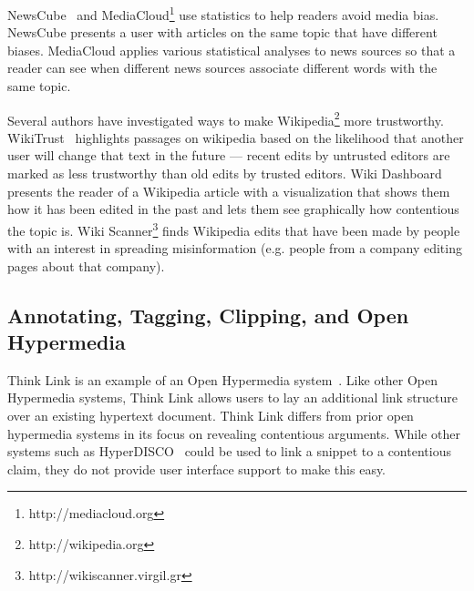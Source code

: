 \documentclass{chi2009}
\newcommand{\todo}[1]{}
\begin{document}

NewsCube~\cite{Park2009} and MediaCloud\footnote{http://mediacloud.org} use statistics to help readers avoid media bias. NewsCube presents a user with articles on the same topic that have different biases. MediaCloud applies various statistical analyses to news sources so that a reader can see when different news sources associate different words with the same topic.

Several authors have investigated ways to make Wikipedia\footnote{http://wikipedia.org} more trustworthy. WikiTrust~\cite{Adler2008a} highlights passages on wikipedia based on the likelihood that another user will change that text in the future --- recent edits by untrusted editors are marked as less trustworthy than old edits by trusted editors. Wiki Dashboard~\cite{Kittur2008} presents the reader of a Wikipedia article with a visualization that shows them how it has been edited in the past and lets them see graphically how contentious the topic is. Wiki Scanner\footnote{http://wikiscanner.virgil.gr} finds Wikipedia edits that have been made by people with an interest in spreading misinformation (e.g. people from a company editing pages about that company).

% 
% 

\subsection{Annotating, Tagging, Clipping, and Open Hypermedia}

Think Link is an example of an Open Hypermedia system~\cite{Bouvin2000}. Like other Open Hypermedia systems, Think Link allows users to lay an additional link structure over an existing hypertext document. Think Link differs from prior open hypermedia systems in its focus on revealing contentious arguments. While other systems such as HyperDISCO~\cite{Wiil1996} could be used to link a snippet to a contentious claim, they do not provide user interface support to make this easy.

\todo{Say how different from other Open Hypermedia link annotation systems}
\end{document}
